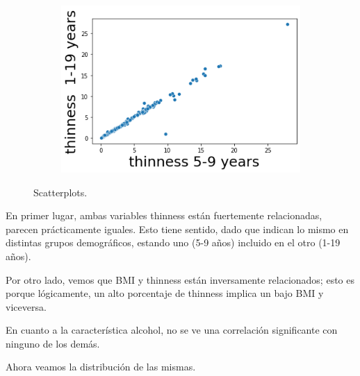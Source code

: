 \begin{itemize}
\begin{figure}[H]
\begin{subfigure}{0.2\linewidth}
              \end{subfigure}
                            \hfill
                \begin{subfigure}{0.2\linewidth}
                \centering
                \includegraphics[width=\textwidth]{img/29.png}
              \end{subfigure}
               \caption{Scatterplots.}
               \label{fig: 10}
        \end{figure}
    
    En primer lugar, ambas variables thinness están fuertemente relacionadas, parecen prácticamente iguales. Esto tiene sentido, dado que indican lo mismo en distintas grupos demográficos, estando uno (5-9 años) incluido en el otro (1-19 años).  
    
    Por otro lado, vemos que BMI y thinness están inversamente relacionados; esto es porque lógicamente, un alto porcentaje de thinness implica un bajo BMI y viceversa.
    
    En cuanto a la característica alcohol, no se ve una correlación significante con ninguno de los demás.
    
    Ahora veamos la distribución de las mismas.
        

\end{itemize}
